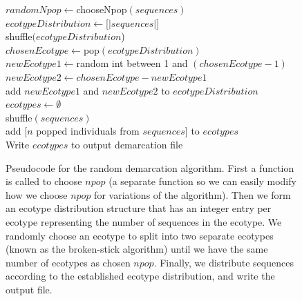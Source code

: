 \begin{figure}[h!]
\begin{algorithm}[H]
 \SetAlgoLined

\BlankLine
 $randomNpop \gets $chooseNpop$(sequences)$\\
 $ecotypeDistribution \gets $[$|sequences|$]\\
  {
 shuffle$(ecotypeDistribution$)\\
 $chosenEcotype \gets $pop$(ecotypeDistribution)$\\
  {
 $newEcotype1 \gets $random int between 1 and $(chosenEcotype - 1)$\\
 $newEcotype2 \gets chosenEcotype - newEcotype1$\\
 add $newEcotype1$ and $newEcotype2$ to $ecotypeDistribution$\\
 }
 }
 $ecotypes \gets \emptyset$\\
 shuffle$(sequences)$\\
  {
 add [$n$ popped individuals from $sequences$] to $ecotypes$\\
 }
 Write $ecotypes$ to output demarcation file\\
\end{algorithm}
\caption[Pseudocode showing a random demarcator.]{Pseudocode for the random demarcation algorithm. First a function is called to choose $npop$ (a separate function so we can easily modify how we choose $npop$ for variations of the algorithm). Then we form an ecotype distribution structure that has an integer entry per ecotype representing the number of sequences in the ecotype. We randomly choose an ecotype to split into two separate ecotypes (known as the broken-stick algorithm) until we have the same number of ecotypes as chosen $npop$. Finally, we distribute sequences according to the established ecotype distribution, and write the output file.}
\label{code:RandomDemarcating}
\end{figure}


